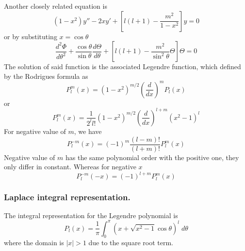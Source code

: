 \documentclass[../main.tex]{subfiles}
\begin{document}
Another closely related equation is
\begin{equation*}
    (1-x^2)y''-2xy'+\left[l(l+1)-\frac{m^2}{1-x^2}\right]y =0
\end{equation*}
or by substituting $x=\cos\theta$
\begin{equation*}
    \frac{d^2\Phi}{d\theta^2} +\frac{\cos \theta}{\sin\theta}\frac{d\Theta}{d\theta} +\left[l(l+1)-\frac{m^2}{\sin^2\theta}\Theta \right]\Theta =0
\end{equation*}
The solution of said function is the associated Legendre function, which defined by the Rodrigues formula as
\begin{equation*}
    P_l^m(x)=(1-x^2)^{m/2}\left(\frac{d}{dx}\right)^{m}P_l(x)
\end{equation*}
or
\begin{equation*}
    P_l^m(x)=\frac{1}{2^ll!}(1-x^2)^{m/2}\left(\frac{d}{dx}\right)^{l+m}(x^2-1)^l
\end{equation*}
For negative value of $m$, we have
\begin{equation*}
    P_l^{-m}(x)=(-1)^m\frac{(l-m)!}{(l+m)!}P_l^m(x)
\end{equation*}
Negative value of $m$ has the same polynomial order with the positive one, they only differ in constant.
Whereas for negative $x$
\begin{equation*}
    P_l^{-m}(-x)=(-1)^{l+m}P_l^m(x)
\end{equation*}


\subsubsection*{Laplace integral representation.} The integral representation for the Legendre polynomial is
\begin{equation*}
    P_l(x)=\frac{1}{\pi}\int_{0}^{\pi}\left(x+\sqrt{x^2-1}\cos\theta\right)^l\;d\theta
\end{equation*}
where the domain is $|x|>1$ due to the square root term.
\end{document}
